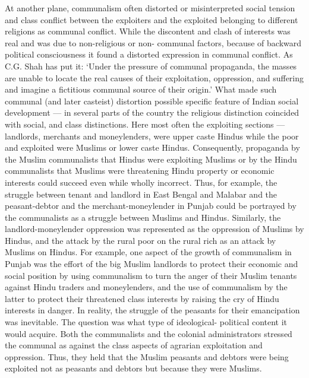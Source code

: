 \begin{multicols}{2}
At another plane, communalism often distorted or misinterpreted social tension and class conflict between the exploiters and the exploited belonging to different religions as communal conflict. While the discontent and clash of interests was real and was due to non-religious or non- communal factors, because of backward political consciousness it found a distorted expression in communal conflict. As C.G. Shah has put it: `Under the pressure of communal propaganda, the masses are unable to locate the real causes of their exploitation, oppression, and suffering and imagine a fictitious communal source of their origin.' What made such communal (and later casteist) distortion possible specific feature of Indian social development --- in several parts of the country the religious distinction coincided with social, and class distinctions. Here most often the exploiting sections --- landlords, merchants and moneylenders, were upper caste Hindus while the poor and exploited were Muslims or lower caste Hindus. Consequently, propaganda by the Muslim communalists that Hindus were exploiting Muslims or by the Hindu communalists that Muslims were threatening Hindu property or economic interests could succeed even while wholly incorrect. Thus, for example, the struggle between tenant and landlord in East Bengal and Malabar and the peasant-debtor and the merchant-moneylender in Punjab could be portrayed by the communalists as a struggle between Muslims and Hindus. Similarly, the landlord-moneylender oppression was represented as the oppression of Muslims by Hindus, and the attack by the rural poor on the rural rich as an attack by Muslims on Hindus. For example, one aspect of the growth of communalism in Punjab was the effort of the big Muslim landlords to protect their economic and social position by using communalism to turn the anger of their Muslim tenants against Hindu traders and moneylenders, and the use of communalism by the latter to protect their threatened class interests by raising the cry of Hindu interests in danger. In reality, the struggle of the peasants for their emancipation was inevitable. The question was what type of ideological- political content it would acquire. Both the communalists and the colonial administrators stressed the communal as against the class aspects of agrarian exploitation and oppression. Thus, they held that the Muslim peasants and debtors were being exploited not as peasants and debtors but because they were Muslims. 


\end{multicols}
